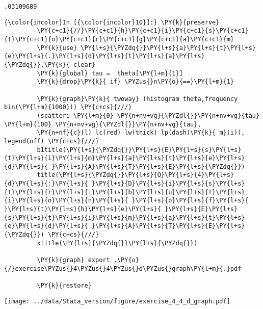 \documentclass[11pt,notitlepage]{article}\usepackage[]{graphicx}\usepackage[]{color}
\makeatletter
\newenvironment{kframe}{%
 \def\at@end@of@kframe{}%
 \ifinner\ifhmode%
  \def\at@end@of@kframe{\end{minipage}}%
  \begin{minipage}{\columnwidth}%
 \fi\fi%
 \def\FrameCommand##1{\hskip\@totalleftmargin \hskip-\fboxsep
 \colorbox{shadecolor}{##1}\hskip-\fboxsep
     \hskip-\linewidth \hskip-\@totalleftmargin \hskip\columnwidth}%
 \MakeFramed {\advance\hsize-\width
   \@totalleftmargin\z@ \linewidth\hsize
   \@setminipage}}%
 {\par\unskip\endMakeFramed%
 \at@end@of@kframe}
\newenvironment{knitrout}{}{} %
\makeatother
\begin{document}
\begin{enumerate}[a)]
\begin{knitrout}
\begin{kframe}
    \begin{Verbatim}[commandchars=\\\{\}]
.03109689

    \end{Verbatim}

    \begin{Verbatim}[commandchars=\\\{\}]
{\color{incolor}In [{\color{incolor}10}]:} \PY{k}{preserve}
         \PY{c+c1}{//}\PY{c+c1}{h}\PY{c+c1}{i}\PY{c+c1}{s}\PY{c+c1}{t}\PY{c+c1}{o}\PY{c+c1}{r}\PY{c+c1}{g}\PY{c+c1}{a}\PY{c+c1}{m}
         \PY{k}{use} \PY{l+s}{\PYZdq{}}\PY{l+s}{a}\PY{l+s}{t}\PY{l+s}{e}\PY{l+s}{.}\PY{l+s}{d}\PY{l+s}{t}\PY{l+s}{a}\PY{l+s}{\PYZdq{}},\PY{k}{ clear}
         \PY{k}{global} tau =  theta[\PY{l+m}{1}]
         \PY{k}{drop}\PY{k}{ if} \PYZus{}n\PY{o}{==}\PY{l+m}{1}
         
         \PY{k}{graph}\PY{k}{ twoway} (histogram theta,frequency bin(\PY{l+m}{1000})) \PY{c+cs}{///}
         (scatteri \PY{l+m}{0} \PY{n+nv+vg}{\PYZdl{}}\PY{n+nv+vg}{tau} \PY{l+m}{100} \PY{n+nv+vg}{\PYZdl{}}\PY{n+nv+vg}{tau}, 
         \PY{n+nf}{c}(l) lc(red) lw(thick) lp(dash)\PY{k}{ m}(i)), legend(off) \PY{c+cs}{///}
         b1title(\PY{l+s}{\PYZdq{}}\PY{l+s}{E}\PY{l+s}{s}\PY{l+s}{t}\PY{l+s}{i}\PY{l+s}{m}\PY{l+s}{a}\PY{l+s}{t}\PY{l+s}{e}\PY{l+s}{d}\PY{l+s}{ }\PY{l+s}{A}\PY{l+s}{T}\PY{l+s}{E}\PY{l+s}{\PYZdq{}}) 
         title(\PY{l+s}{\PYZdq{}}\PY{l+s}{Q}\PY{l+s}{4}\PY{l+s}{d}\PY{l+s}{:}\PY{l+s}{ }\PY{l+s}{D}\PY{l+s}{i}\PY{l+s}{s}\PY{l+s}{t}\PY{l+s}{r}\PY{l+s}{i}\PY{l+s}{b}\PY{l+s}{u}\PY{l+s}{t}\PY{l+s}{i}\PY{l+s}{o}\PY{l+s}{n}\PY{l+s}{ }\PY{l+s}{o}\PY{l+s}{f}\PY{l+s}{ }\PY{l+s}{t}\PY{l+s}{h}\PY{l+s}{e}\PY{l+s}{ }\PY{l+s}{E}\PY{l+s}{s}\PY{l+s}{t}\PY{l+s}{i}\PY{l+s}{m}\PY{l+s}{a}\PY{l+s}{t}\PY{l+s}{e}\PY{l+s}{d}\PY{l+s}{ }\PY{l+s}{A}\PY{l+s}{T}\PY{l+s}{E}\PY{l+s}{\PYZdq{}}) \PY{c+cs}{///}
         xtitle(\PY{l+s}{\PYZdq{}}\PY{l+s}{\PYZdq{}})
         
         \PY{k}{graph} export .\PY{o}{/}exercise\PYZus{}4\PYZus{}4\PYZus{}d\PYZus{}graph\PY{l+m}{.}pdf
         
         \PY{k}{restore}
\end{Verbatim}


\end{kframe}

{\centering \texttt{[image: ../data/Stata\_version/figure/exercise\_4\_4\_d\_graph.pdf]} 

}




\end{knitrout}
\end{enumerate}
\end{document}
